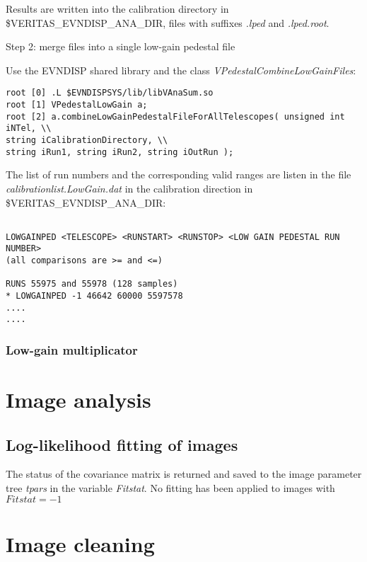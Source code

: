\documentclass[titlepage,a4paper,twoside,11pt]{report}
\begin{document}
Results are written into the calibration directory in \$VERITAS\_EVNDISP\_ANA\_DIR, 
files with suffixes {\it.lped} and {\it .lped.root}.

Step 2: merge files into a single low-gain pedestal file

Use the EVNDISP shared library and the class {\it VPedestalCombineLowGainFiles}:

\begin{lstlisting}
root [0] .L $EVNDISPSYS/lib/libVAnaSum.so
root [1] VPedestalLowGain a;
root [2] a.combineLowGainPedestalFileForAllTelescopes( unsigned int iNTel, \\
string iCalibrationDirectory, \\
string iRun1, string iRun2, string iOutRun );
\end{lstlisting}

The list of run numbers and the corresponding valid ranges are listen in the file
{\it calibrationlist.LowGain.dat} in the calibration direction in \$VERITAS\_EVNDISP\_ANA\_DIR:

\begin{lstlisting}

LOWGAINPED <TELESCOPE> <RUNSTART> <RUNSTOP> <LOW GAIN PEDESTAL RUN NUMBER>
(all comparisons are >= and <=)

RUNS 55975 and 55978 (128 samples)
* LOWGAINPED -1 46642 60000 5597578 
....
....

\end{lstlisting}

\subsubsection{Low-gain multiplicator}

\section{Image analysis}

\subsection{Log-likelihood fitting of images}

The status of the covariance matrix is returned and saved to the image parameter tree {\it tpars} in the variable {\it Fitstat}. 
No fitting has been applied to images with $Fitstat=-1$ 

\section{Image cleaning}
\end{document}

